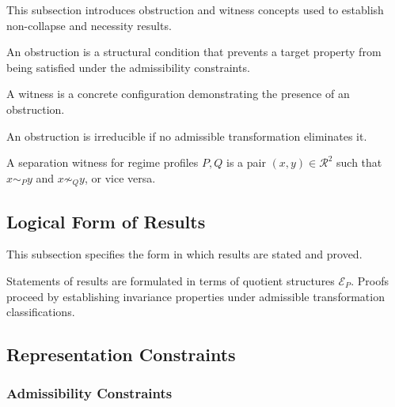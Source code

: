 This subsection introduces obstruction and witness concepts
used to establish non-collapse and necessity results.

\begin{definition}[Obstruction]
  \label{def:obstruction}
  An obstruction is a structural condition that prevents a target property
  from being satisfied under the admissibility constraints.
\end{definition}

\begin{definition}[Witness]
  \label{def:witness}
  A witness is a concrete configuration demonstrating the presence of an obstruction.
\end{definition}

\begin{definition}
  \label{def:irreducible_obstruction}
  An obstruction is irreducible if no admissible transformation eliminates it.
\end{definition}

\begin{definition}
  \label{def:separation_witness}
  A separation witness for regime profiles $P, Q$ is a pair $(x,y) \in \mathcal{R}^2$
  such that $x \sim_P y$ and $x \not\sim_Q y$, or vice versa.
\end{definition}

\subsection{Logical Form of Results}
\label{subsec:logical_form}

This subsection specifies the form
in which results are stated and proved.


  Statements of results are formulated
  in terms of quotient structures $\mathcal{E}_P$.
  Proofs proceed by establishing invariance properties
  under admissible transformation classifications.




\subsection{Representation Constraints}
\label{subsec:representation_constraints}

\subsubsection{Admissibility Constraints}


